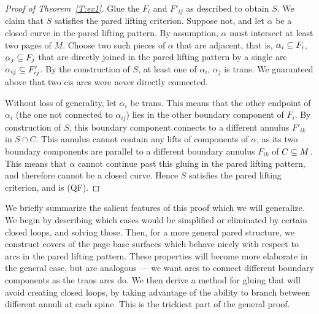 \begin{proof}[Proof of Theorem~\ref{T:ex1}]
Glue the $F_i$ and $F'_{ij}$ as described to obtain $S$. We claim that $S$
satisfies the pared lifting criterion. Suppose not, and let $\alpha$ be
a closed curve in the pared lifting pattern.  By assumption, $\alpha$ must
intersect at least two pages of $M$. Choose two such pieces of $\alpha$ that
are adjacent, that is, $\alpha_i\subseteq F_i$, $\alpha_j \subseteq F_j$ that are
directly joined in the pared lifting pattern by a single arc $\alpha_{ij} \subseteq
F'_{ij}$.  By the construction of $S$, at least one of $\alpha_i$, $\alpha_j$
is trans. We guaranteed above that two cis arcs were never directly connected.

Without loss of generality, let $\alpha_i$ be trans. This means that the other
endpoint of $\alpha_i$ (the one not connected to $\alpha_{ij}$) lies in the
other boundary component of $F_i$. By construction of $S$, this boundary
component connects to a different annulus $F'_{ik}$ in $S\cap C$. This annulus
cannot contain any lifts of components of $\alpha$, as its two boundary
components are parallel to a different boundary annulus $F_{ik}$ of $C\subseteq M$.
This means that $\alpha$ cannot continue past this gluing in the pared lifting
pattern, and therefore cannot be a closed curve. Hence $S$ satisfies the pared
lifting criterion, and is (QF).

\end{proof}

We briefly summarize the salient features of this proof which we will
generalize.  We begin by describing which cases would be simplified or
eliminated by certain closed loops, and solving those. Then, for a more general
pared structure, we construct covers of the page base surfaces which behave
nicely with respect to arcs in the pared lifting pattern.  These properties
will become more elaborate in the general case, but are analogous --- we want
arcs to connect different boundary components as the trans arcs do.  We then
derive a method for gluing that will avoid creating closed loops, by taking
advantage of the ability to branch between different annuli at each spine. This
is the trickiest part of the general proof.
